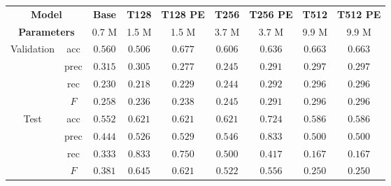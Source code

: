 \begin{tabular}{cc|ccccccc}
    \multicolumn{2}{c|}{\textbf{Model}} & \textbf{Base} & \textbf{T128} & \textbf{T128 PE} & \textbf{T256} & \textbf{T256 PE} & \textbf{T512} & \textbf{T512 PE}\\
    \multicolumn{2}{c|}{\textbf{Parameters}} & 0.7 M & 1.5 M & 1.5 M & 3.7 M & 3.7 M & 9.9 M & 9.9 M \\\hline
    \multirow{4}{*}{Validation} & acc  & $0.560$          & $0.506$          & $\mathbf{0.677}$ & $0.606$ & $0.636$ & $0.663$ & $0.663$ \\
    & prec & $\mathbf{0.315}$ & $0.305$          & $0.277$          & $0.245$ & $0.291$          & $0.297$          & $0.297$          \\
    & rec  & $0.230$          & $0.218$          & $0.229$          & $0.244$ & $0.292$          & $\mathbf{0.296}$ & $\mathbf{0.296}$ \\
    & $F$  & $0.258$          & $0.236$          & $0.238$          & $0.245$ & $0.291$          & $\mathbf{0.296}$ & $\mathbf{0.296}$ \\\hline
    \multirow{4}{*}{Test}       & acc  & $0.552$          & $0.621$          & $0.621$          & $0.621$ & $\mathbf{0.724}$ & $0.586$ & $0.586$ \\
    & prec & $0.444$          & $0.526$          & $0.529$          & $0.546$ & $\mathbf{0.833}$ & $0.500$          & $0.500$          \\
    & rec  & $0.333$          & $\mathbf{0.833}$ & $0.750$          & $0.500$ & $0.417$          & $0.167$          & $0.167$          \\
    & $F$  & $0.381$          & $\mathbf{0.645}$ & $0.621$          & $0.522$ & $0.556$          & $0.250$          & $0.250$          \\
\end{tabular}